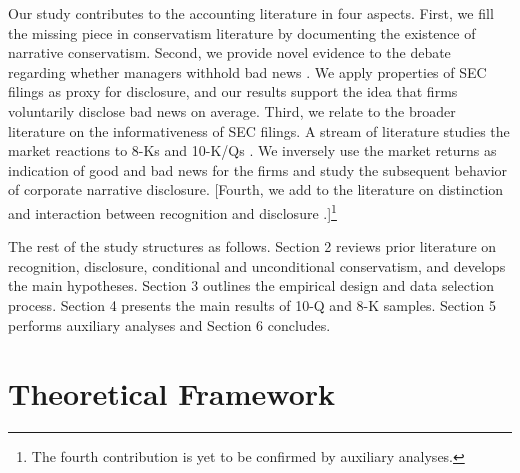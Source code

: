 \documentclass[a4paper]{article}
\begin{document}
\begin{spacing}{2}
Our study contributes to the accounting literature in four aspects. First, we fill the missing piece in conservatism literature by documenting the existence of narrative conservatism. Second, we provide novel evidence to the debate regarding whether managers withhold bad news \citep{baoManagersDiscloseWithhold2019, kothariManagersWithholdBad2009, skinnerWhyFirmsVoluntarily1994, skinnerEarningsDisclosuresStockholder1997, segalAreManagersStrategic2016}. We apply properties of SEC filings as proxy for disclosure, and our results support the idea that firms voluntarily disclose bad news on average. Third, we relate to the broader literature on the informativeness of SEC filings. A stream of literature studies the market reactions to 8-Ks \citep*{lermanNewForm8K2010, carterRelevanceForm8K1999, pinskerHasFirmsForm2006} and 10-K/Qs \citep*{alfordExtensionsViolationsStatutory1994, liAnnualReportReadability2008, liInformationContentForwardLooking2010}. We inversely use the market returns as indication of good and bad news for the firms and study the subsequent behavior of corporate narrative disclosure. [Fourth, we add to the literature on distinction and interaction between recognition and disclosure \citep*{schipperRequiredDisclosuresFinancial2007, barthMarketEffectsRecognition2003, aboodyRecognitionDisclosureOil1996}.]\footnote{The fourth contribution is yet to be confirmed by auxiliary analyses.}

The rest of the study structures as follows. Section 2 reviews prior literature on recognition, disclosure, conditional and unconditional conservatism, and develops the main hypotheses. Section 3 outlines the empirical design and data selection process. Section 4 presents the main results of 10-Q and 8-K samples. Section 5 performs auxiliary analyses and Section 6 concludes.

\section{Theoretical Framework}

\end{spacing}
\end{document}
